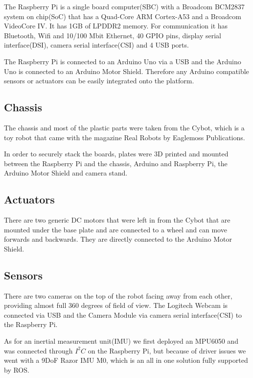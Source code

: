 \documentclass[class=article, crop=false]{standalone}
\begin{document}
The Raspberry Pi is a single board computer(SBC) with a Broadcom BCM2837 system on chip(SoC) that has a Quad-Core ARM Cortex-A53 and a Broadcom VideoCore IV. It has 1GB of LPDDR2 memory. For communication it has Bluetooth, Wifi and 10/100 Mbit Ethernet, 40 GPIO pins, display serial interface(DSI), camera serial interface(CSI) and 4 USB ports\footnotemark.


The Raspberry Pi is connected to an Arduino Uno via a USB and the Arduino Uno is connected to an Arduino Motor Shield. Therefore any Arduino compatible sensors or actuators can be easily integrated onto the platform.

\subsection{Chassis}\label{subsec:chassis}
The chassis and most of the plastic parts were taken from the Cybot, which is a toy robot that came with the magazine Real Robots by Eaglemoss Publications\footnotemark.


In order to securely stack the boards, plates were 3D printed and mounted between the Raspberry Pi and the chassis, Arduino and Raspberry Pi, the Arduino Motor Shield and camera stand.

\subsection{Actuators}\label{subsec:actuators}
There are two generic DC motors that were left in from the Cybot that are mounted under the base plate and are connected to a wheel and can move forwards and backwards. They are directly connected to the Arduino Motor Shield.

\subsection{Sensors}\label{subsec:sensors}
There are two cameras on the top of the robot facing away from each other, providing almost full 360 degrees of field of view. The Logitech Webcam is connected via USB and the Camera Module via camera serial interface(CSI) to the Raspberry Pi.

As for an inertial measurement unit(IMU) we first deployed an MPU6050 and was connected through $ I^2C $ on the Raspberry Pi, but because of driver issues we went with a 9DoF Razor IMU M0, which is an all in one solution fully supported by ROS.
\end{document}
